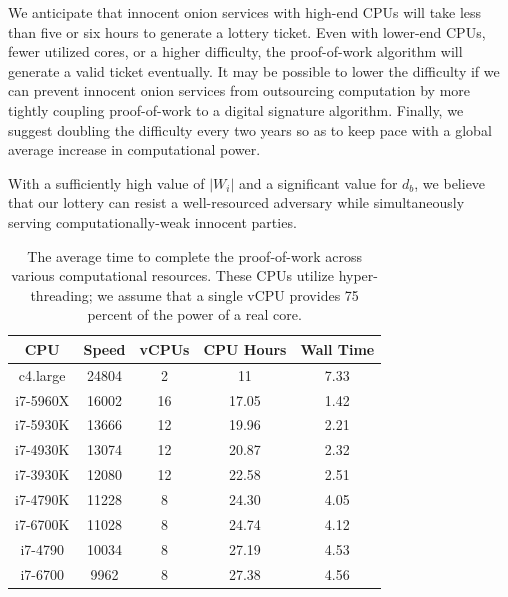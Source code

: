 \documentclass[USenglish,oneside,twocolumn]{article}
\newcommand*\nWinners{\left\vert{W_{i}}\right\vert}
\begin{document}

We anticipate that innocent onion services with high-end CPUs will take less than five or six hours to generate a lottery ticket. Even with lower-end CPUs, fewer utilized cores, or a higher difficulty, the proof-of-work algorithm will generate a valid ticket eventually. It may be possible to lower the difficulty if we can prevent innocent onion services from outsourcing computation by more tightly coupling proof-of-work to a digital signature algorithm. Finally, we suggest doubling the difficulty every two years so as to keep pace with a global average increase in computational power.

With a sufficiently high value of $ \nWinners $ and a significant value for $ d_{b} $, we believe that our lottery can resist a well-resourced adversary while simultaneously serving computationally-weak innocent parties.

\begin{center}
	\vspace{-5mm}
	\begin{table}[htp]
		\hspace{5 mm}
  		\begin{tabular}{ | c | c | c | c | c | }
  		\textbf{CPU} & \textbf{Speed} & \textbf{vCPUs} & \textbf{CPU Hours} & \textbf{Wall Time} \\ \hline
  		c4.large & 24804 & 2 & 11 & 7.33 \\ \hline
  		i7-5960X	 & 16002 & 16 & 17.05 & 1.42 \\ \hline
  		i7-5930K & 13666 & 12 & 19.96 & 2.21 \\ \hline
  		i7-4930K & 13074 & 12 & 20.87 & 2.32 \\ \hline
  		i7-3930K & 12080 & 12 & 22.58 & 2.51 \\ \hline
  		i7-4790K & 11228 & 8 & 24.30 & 4.05 \\ \hline
  		i7-6700K & 11028 & 8 & 24.74 & 4.12 \\ \hline
  		i7-4790 & 10034 & 8 & 27.19 & 4.53 \\ \hline
  		i7-6700 & 9962 & 8 & 27.38 & 4.56 \\
		\end{tabular}
		\caption{The average time to complete the proof-of-work across various computational resources. These CPUs utilize hyper-threading; we assume that a single vCPU provides 75 percent of the power of a real core.}
		\label{table:PoWtime}
	\end{table}
	\vspace{-10mm}
\end{center}
\end{document}
